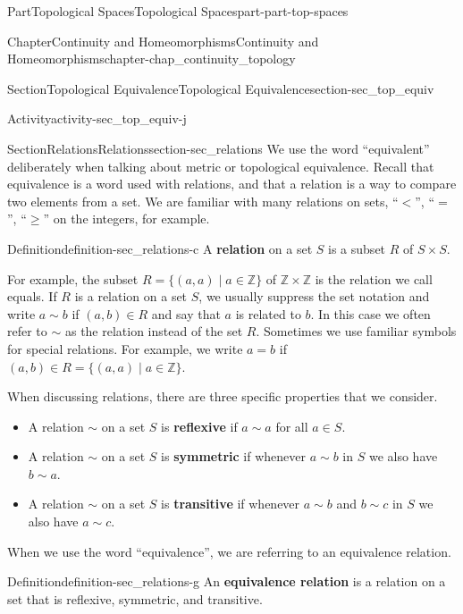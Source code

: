 \documentclass[oneside,10pt,]{book}
\newcommand{\terminology}[1]{\textbf{#1}}
\numberwithin{equation}{chapter}
\newcommand{\Z}{\mathbb{Z}}
\newcommand{\lt}{<}
\begin{document}
\begin{partptx}{Part}{Topological Spaces}{}{Topological Spaces}{}{}{part-part-top-spaces}
\begin{chapterptx}{Chapter}{Continuity and Homeomorphisms}{}{Continuity and Homeomorphisms}{}{}{chapter-chap_continuity_topology}
\begin{sectionptx}{Section}{Topological Equivalence}{}{Topological Equivalence}{}{}{section-sec_top_equiv}
\begin{activity}{Activity}{}{activity-sec_top_equiv-j}
\begin{enumerate}[font=\bfseries,label=(\alph*),ref=\alph*]
\end{enumerate}%
\end{activity}%
\end{sectionptx}
%
%
\typeout{************************************************}
\typeout{************************************************}
%
\begin{sectionptx}{Section}{Relations}{}{Relations}{}{}{section-sec_relations}
We use the word ``equivalent'' deliberately when talking about metric or topological equivalence. Recall that equivalence is a word used with relations, and that a relation is a way to compare two elements from a set. We are familiar with many relations on sets, ``\(\lt\)'', ``\(=\)'', ``\(\geq\)'' on the integers, for example.%
\begin{definition}{Definition}{}{definition-sec_relations-c}%
%
A \terminology{relation} on a set \(S\) is a subset \(R\) of \(S \times S\).%
\end{definition}
For example, the subset \(R = \{(a,a) \mid a \in \Z \}\) of \(\Z \times \Z\) is the relation we call equals. If \(R\) is a relation on a set \(S\), we usually suppress the set notation and write \(a \sim b\) if \((a,b) \in R\) and say that \(a\) is related to \(b\). In this case we often refer to \(\sim\) as the relation instead of the set \(R\). Sometimes we use familiar symbols for special relations. For example, we write \(a = b\) if \((a,b) \in R = \{(a,a) \mid a \in \Z \}\).%
\par
When discussing relations, there are three specific properties that we consider.%
\begin{itemize}[label=\textbullet]
\item{}A relation \(\sim\) on a set \(S\) is \terminology{reflexive} if \(a \sim a\) for all \(a \in S\).%
\item{}A relation \(\sim\) on a set \(S\) is \terminology{symmetric} if whenever \(a \sim b\) in \(S\) we also have \(b \sim a\).%
\item{}A relation \(\sim\) on a set \(S\) is \terminology{transitive} if whenever \(a \sim b\) and \(b \sim c\) in \(S\) we also have \(a \sim c\).%
\end{itemize}
%
\par
When we use the word ``equivalence'', we are referring to an equivalence relation.%
\begin{definition}{Definition}{}{definition-sec_relations-g}%
%
An \terminology{equivalence relation} is a relation on a set that is reflexive, symmetric, and transitive.%

\end{definition}
\end{sectionptx}
\end{chapterptx}
\end{partptx}
\end{document}
